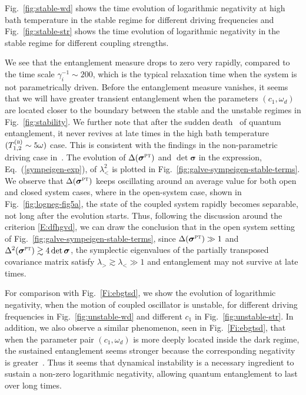 \documentclass[11pt,a4paper]{article}
\begin{document}
Fig.~\ref{fig:stable-wd} shows the time evolution of logarithmic negativity at high bath temperature in the stable regime for different driving frequencies and Fig.~\ref{fig:stable-str} shows the time evolution of logarithmic negativity in the stable regime for different coupling strengths.

We see that the entanglement measure drops to zero very rapidly, compared to the time scale $\gamma_{i}^{-1}\sim200$, which is the typical relaxation time when the system is not parametrically driven. Before the entanglement measure vanishes, it seems that we will have greater transient entanglement when the parameters $(c_{1},\omega_{d})$ are located closer to the boundary between the stable and the unstable regimes in Fig.~\ref{fig:stability}. We further note that after the sudden death~\cite{YuEberly} of quantum entanglement, it never revives at late times in the high bath temperature $(T^{(\textsc{b})}_{1,2}\sim5\omega)$ case. This is consistent with the findings in the non-parametric driving case in~\cite{HH15PLB,Anders,AndWin,HH15JHEP}. The evolution of $\Delta(\bm{\sigma}^{\textsc{pt}})$ and $\det \bm{\sigma} $ in the expression, Eq.~(\ref{sympeigen-exp}), of $\lambda_{<}^{2}$ is plotted in Fig.~\ref{fig:galve-sympeigen-stable-terms}. We observe that  $\Delta(\bm{\sigma}^{\textsc{pt}})$ keeps oscillating around an average value for both open and closed system cases, {where in the open-system case, shown in Fig.~\ref{fig:logneg-fig5a}, the state of the coupled system rapidly becomes separable, not long after the evolution starts}. Thus, following the discussion around the criterion \eqref{E:dfhgvd}, we can draw the conclusion that {in the open system setting of Fig.~\ref{fig:galve-sympeigen-stable-terms}, since} $\Delta(\bm{\sigma}^{\textsc{pt}})\gg1$ and $\Delta^{2}(\bm{\sigma}^{\textsc{pt}})\gtrsim4 \det \bm{\sigma}$, the symplectic eigenvalues of the partially transposed covariance matrix satisfy $\lambda_{>}\gtrsim\lambda_{<}\gg1$ and entanglement { may not survive} at late times.




For comparison with Fig.~\ref{Fi:ebgtsd}, we show the evolution of logarithmic negativity, when the motion of coupled oscillator is unstable, for different driving frequencies in Fig.~\ref{fig:unstable-wd} and different $c_{1}$ in Fig.~\ref{fig:unstable-str}. In addition, we also observe a similar phenomenon, seen in Fig.~\ref{Fi:ebgtsd}, that when the parameter pair $(c_1,\omega_{d})$ is more deeply located inside the dark regime, the sustained entanglement seems stronger because the corresponding negativity is greater~\cite{Eisert98,Virmani}. Thus it seems that dynamical instability is a necessary ingredient to sustain a non-zero logarithmic negativity, allowing quantum entanglement to last over long times. 
 
\end{document}
